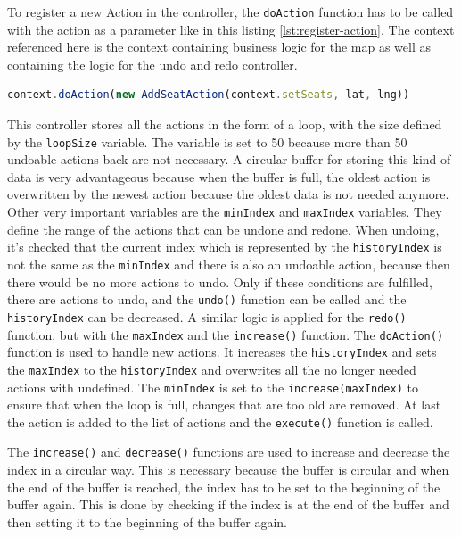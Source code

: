 To register a new Action in the controller, the \texttt{doAction} function has to be called with the action as a parameter like in this listing \ref{lst:register-action}. The context referenced here is the context containing business logic for the map as well as containing the logic for the undo and redo controller.

\begin{lstlisting}[language=TypeScript,caption={Registering a new action in the controller},label={lst:register-action}]
context.doAction(new AddSeatAction(context.setSeats, lat, lng))
\end{lstlisting}

This controller stores all the actions in the form of a loop, with the size defined by the \texttt{loopSize} variable. The variable is set to 50 because more than 50 undoable actions back are not necessary. A circular buffer for storing this kind of data is very advantageous because when the buffer is full, the oldest action is overwritten by the newest action because the oldest data is not needed anymore. Other very important variables are the \texttt{minIndex} and \texttt{maxIndex} variables. They define the range of the actions that can be undone and redone. When undoing, it's checked that the current index which is represented by the \texttt{historyIndex} is not the same as the \texttt{minIndex} and there is also an undoable action, because then there would be no more actions to undo. Only if these conditions are fulfilled, there are actions to undo, and the \texttt{undo()} function can be called and the \texttt{historyIndex} can be decreased. A similar logic is applied for the \texttt{redo()} function, but with the \texttt{maxIndex} and the \texttt{increase()} function. The \texttt{doAction()} function is used to handle new actions. It increases the \texttt{historyIndex} and sets the \texttt{maxIndex} to the \texttt{historyIndex} and overwrites all the no longer needed actions with undefined. The \texttt{minIndex} is set to the \texttt{increase(maxIndex)} to ensure that when the loop is full, changes that are too old are removed. At last the action is added to the list of actions and the \texttt{execute()} function is called.

The \texttt{increase()} and \texttt{decrease()} functions are used to increase and decrease the index in a circular way. This is necessary because the buffer is circular and when the end of the buffer is reached, the index has to be set to the beginning of the buffer again. This is done by checking if the index is at the end of the buffer and then setting it to the beginning of the buffer again.

